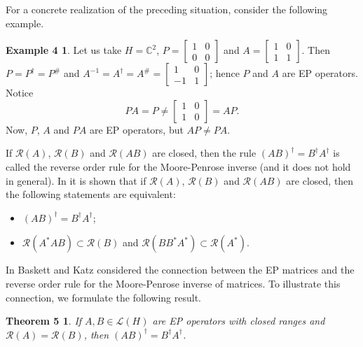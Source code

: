 \documentclass{proc-l}
\theoremstyle{plain}
\newtheorem*{theorem3}{Theorem 5}
\theoremstyle{remark}
\theoremstyle{definition}
\newtheorem*{definition1}{Example 4}
\begin{document}
For a concrete realization of the preceding situation, consider the
following example.

\begin{definition1}
Let us take $H=\mathbb{C} ^{2}$, $P=%
\begin{bmatrix}
1 & 0 \\ 
0 & 0%
\end{bmatrix}
$ and $A=%
\begin{bmatrix}
1 & 0 \\ 
1 & 1%
\end{bmatrix}
$. Then $P=P^{\dag }=P^{\#}$ and $A^{-1}=A^{\dag }=A^{\#}=%
\begin{bmatrix}
1 & 0 \\ 
-1 & 1%
\end{bmatrix}
$; hence $P$ and $A$ are EP operators. Notice 
\begin{equation*}
PA=P\neq 
\begin{bmatrix}
1 & 0 \\ 
1 & 0%
\end{bmatrix}
=AP.
\end{equation*}
Now, $P$, $A$ and $PA$ are EP operators, but $AP\neq PA$.
\end{definition1}

If $\mathcal{R} (A)$, $\mathcal{R} (B)$ and $\mathcal{R} (AB)$ are closed,
then the rule $(AB)^{\dag }=B^{\dag }A^{\dag }$ is called the reverse order
rule for the Moore-Penrose inverse (and it does not hold in general). In %
\cite{3} it is shown that if $\mathcal{R} (A)$, $\mathcal{R} (B)$ and $%
\mathcal{R} (AB)$ are closed, then the following statements are equivalent:

\begin{itemize}
\item[(a)] $(AB)^{\dag }=B^{\dag }A^{\dag }$;

\item[(b)] $\mathcal{R} (A^{*}AB)\subset\mathcal{R} (B)$ and $\mathcal{R}
(BB^{*}A^{*})\subset \mathcal{R} (A^{*})$.
\end{itemize}

In \cite{1} Baskett and Katz considered the connection between the EP
matrices and the reverse order rule for the Moore-Penrose inverse of
matrices. To illustrate this connection, we formulate the following result.

\begin{theorem3}
If $A,B\in \mathcal{L} (H)$ are EP operators with closed ranges and $%
\mathcal{R} (A)=\mathcal{R} (B)$, then $(AB)^{\dag }=B^{\dag }A^{\dag }$.
\end{theorem3}
\end{document}
